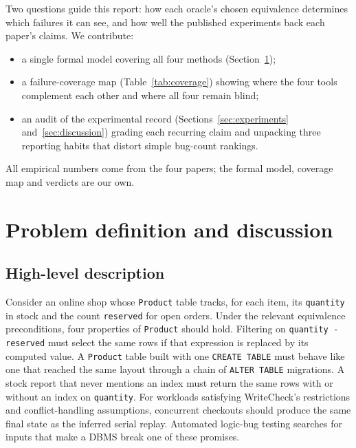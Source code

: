 Two questions guide this report: how each oracle's chosen equivalence determines which failures it can see, and how well the published experiments back each paper's claims. We contribute:
\begin{itemize}[leftmargin=1.1em,itemsep=1pt,topsep=2pt]
\item a single formal model covering all four methods (Section~\ref{sec:problem});
\item a failure-coverage map (Table~\ref{tab:coverage}) showing where the four tools complement each other and where all four remain blind;
\item an audit of the experimental record (Sections~\ref{sec:experiments} and~\ref{sec:discussion}) grading each recurring claim and unpacking three reporting habits that distort simple bug-count rankings.
\end{itemize}
All empirical numbers come from the four papers; the formal model, coverage map and verdicts are our own.

\section{Problem definition and discussion}\label{sec:problem}
\subsection{High-level description}
Consider an online shop whose \texttt{Product} table tracks, for each item, its \texttt{quantity} in stock and the count \texttt{reserved} for open orders. Under the relevant equivalence preconditions, four properties of \texttt{Product} should hold. Filtering on \texttt{quantity - reserved} must select the same rows if that expression is replaced by its computed value. A \texttt{Product} table built with one \texttt{CREATE TABLE} must behave like one that reached the same layout through a chain of \texttt{ALTER TABLE} migrations. A stock report that never mentions an index must return the same rows with or without an index on \texttt{quantity}. For workloads satisfying WriteCheck's restrictions and conflict-handling assumptions, concurrent checkouts should produce the same final state as the inferred serial replay. Automated logic-bug testing searches for inputs that make a DBMS break one of these promises.

